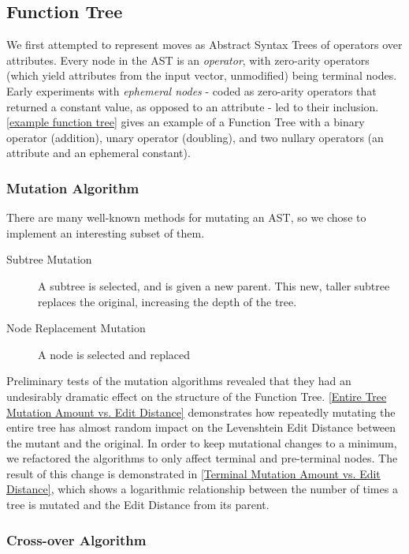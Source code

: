 \documentclass{acm_proc_article-sp}
\begin{document}
\subsection{Function Tree}

We first attempted to represent moves as Abstract Syntax Trees of operators over attributes. Every node in the AST is an \textit{operator}, with zero-arity operators (which yield attributes from the input vector, unmodified) being terminal nodes. Early experiments with \textit{ephemeral nodes} - coded as zero-arity operators that returned a constant value, as opposed to an attribute - led to their inclusion. \ref{example function tree} gives an example of a Function Tree with a binary operator (addition), unary operator (doubling), and two nullary operators (an attribute and an ephemeral constant).

\subsubsection{Mutation Algorithm}

There are many well-known methods for mutating an AST, so we chose to implement an interesting subset of them. 
\begin{description}
    \item[Subtree Mutation] A subtree is selected, and is given a new parent. This new, taller subtree replaces the original, increasing the depth of the tree.\cite{geneticprogramming.us}
    \item[Node Replacement Mutation] A node is selected and replaced
\end{description}
    Preliminary tests of the mutation algorithms revealed that they had an undesirably dramatic effect on the structure of the Function Tree. \ref{Entire Tree Mutation Amount vs. Edit Distance} demonstrates how repeatedly mutating the entire tree has almost random impact on the Levenshtein Edit Distance between the mutant and the original. In order to keep mutational changes to a minimum, we refactored the algorithms to only affect terminal and pre-terminal nodes. The result of this change is demonstrated in \ref{Terminal Mutation Amount vs. Edit Distance}, which shows a logarithmic relationship between the number of times a tree is mutated and the Edit Distance from its parent.
    
    \subsubsection{Cross-over Algorithm}
    
\end{document}
